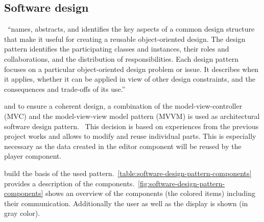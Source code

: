 \documentclass[%
    a4paper,    %
    justified,  %
    nobib,      %
    openany     %
]{tufte-book}
\begin{document}
\subsection{Software design}
\label{results:subsec:software-design}

~\enquote{names, abstracts, and
identifies the key aspects of a common design structure that make it useful for
creating a reusable object-oriented design. The design pattern identifies the
participating classes and instances, their roles and collaborations, and the
distribution of responsibilities. Each design pattern focuses on a particular
object-oriented design problem or issue. It describes when it applies, whether
it can be applied in view of other design constraints, and the consequences and
trade-offs of its use.}~\cite[p. 16]{gamma-dpe-1995}

 and to ensure a coherent
design, a combination of the model-view-controller (MVC) and the model-view-view
model pattern (MVVM) is used as architectural software design
pattern.~\cite{fowler-presentation-2004, gossman-mvvm-2005} This decision is
based on experiences from the previous project works and allows to modify and
reuse individual parts. This is especially necessary as the data created in the
editor component will be reused by the player component.

 build the basis of the used
pattern.~\cref{table:software-design-pattern-components} provides a description
of the components.~\cref{fig:software-design-pattern-components} shows an
overview of the components (the colored items) including their communication.
Additionally the user as well as the display is shown (in gray color).
\end{document}
